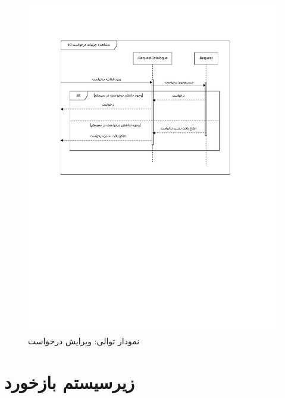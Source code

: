 \begin{figure}[ht!]
	\centering
	\includegraphics[scale=0.8, page=10]{figs/OOD-Sequence-2.pdf}
	\caption{نمودار توالی: ویرایش درخواست}
\end{figure}
\FloatBarrier
\newpage


\section{زیرسیستم بازخورد}


